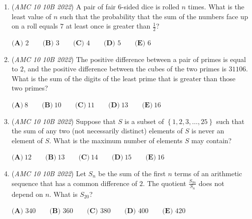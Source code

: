 \begin{enumerate}
 $\textbf{(A) }$ All schools smaller than Euclid HS sold fewer T-shirts than Euclid HS.


 $\textbf{(B) }$ No school that sold more T-shirts than Euclid HS is bigger than Euclid HS.


 $\textbf{(C) }$ All schools bigger than Euclid HS sold fewer T-shirts than Euclid HS.


 $\textbf{(D) }$ All schools that sold fewer T-shirts than Euclid HS are smaller than Euclid HS.


 $\textbf{(E) }$ All schools smaller than Euclid HS sold more T-shirts than Euclid HS.


 

	\item (\textit{AMC 10 10B 2022}) A pair of fair $6$-sided dice is rolled $n$ times. What is the least value of $n$ such that the probability that the sum of the numbers face up on a roll equals $7$ at least once is greater than $\frac{1}{2}$?


 $\textbf{(A) } 2 \qquad \textbf{(B) } 3 \qquad \textbf{(C) } 4 \qquad \textbf{(D) } 5 \qquad \textbf{(E) } 6$


	\item (\textit{AMC 10 10B 2022}) The positive difference between a pair of primes is equal to $2$, and the positive difference between the cubes of the two primes is $31106$. What is the sum of the digits of the least prime that is greater than those two primes?


 $\textbf{(A)}\ 8 \qquad\textbf{(B)}\ 10 \qquad\textbf{(C)}\ 11 \qquad\textbf{(D)}\ 13 \qquad\textbf{(E)}\ 16$


	\item (\textit{AMC 10 10B 2022}) Suppose that $S$ is a subset of $\left\{ 1, 2, 3, \ldots , 25 \right\}$ such that the sum of any two (not necessarily distinct) elements of $S$ is never an element of $S.$ What is the maximum number of elements $S$ may contain?


 $\textbf{(A)}\ 12 \qquad\textbf{(B)}\ 13 \qquad\textbf{(C)}\ 14 \qquad\textbf{(D)}\ 15 \qquad\textbf{(E)}\ 16$


	\item (\textit{AMC 10 10B 2022}) Let $S_n$ be the sum of the first $n$ terms of an arithmetic sequence that has a common difference of $2$. The quotient $\frac{S_{3n}}{S_n}$ does not depend on $n$. What is $S_{20}$?


 $\textbf{(A) } 340 \qquad \textbf{(B) } 360 \qquad \textbf{(C) } 380 \qquad \textbf{(D) } 400 \qquad \textbf{(E) } 420$



\end{enumerate}
